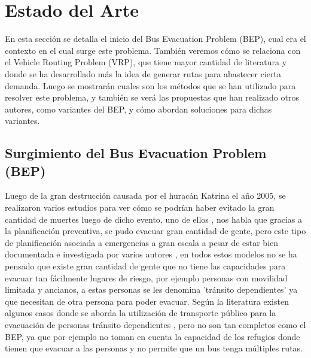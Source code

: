 \documentclass[letter, 10pt]{article}
\begin{document}
\section{Estado del Arte}

En esta sección se detalla el inicio del Bus Evacuation Problem (BEP), cual era el contexto en el cual surge este problema. También veremos cómo se relaciona con el Vehicle Routing Problem (VRP), que tiene mayor cantidad de literatura y donde se ha desarrollado más la idea de generar rutas para abastecer cierta demanda. Luego se mostrarán cuales son los métodos que se han utilizado para resolver este problema, y también se verá las propuestas que han realizado otros autores, como variantes del BEP, y cómo abordan soluciones para dichas variantes.

 \subsection{Surgimiento del Bus Evacuation Problem (BEP)}

Luego de la gran destrucción causada por el huracán Katrina el año 2005, se realizaron varios estudios para ver cómo se podrían haber evitado la gran cantidad de muertes luego de dicho evento, uno de ellos \cite{litman2006lessons}, nos habla que gracias a la planificación preventiva, se pudo evacuar gran cantidad de gente, pero este tipo de planificación asociada a emergencias a gran escala a pesar de estar bien documentada e investigada por varios autores \cite{hamacher2001mathematical,cova2003network,chiu2007modeling}, en todos estos modelos no se ha pensado que existe gran cantidad de gente que no tiene las capacidades para evacuar tan fácilmente lugares de riesgo, por ejemplo personas con movilidad limitada y ancianos, a estas personas se les denomina 'tránsito dependientes' ya que necesitan de otra persona para poder evacuar. Según la literatura existen algunos casos donde se aborda la utilización de transporte público  para la evacuación de personas tránsito dependientes \cite{sayyady2010optimizing}, pero no son tan completos como el BEP, ya que por ejemplo no toman en cuenta la capacidad de los refugios donde tienen que evacuar a las personas y no permite que un bus tenga múltiples rutas.  
\end{document}
